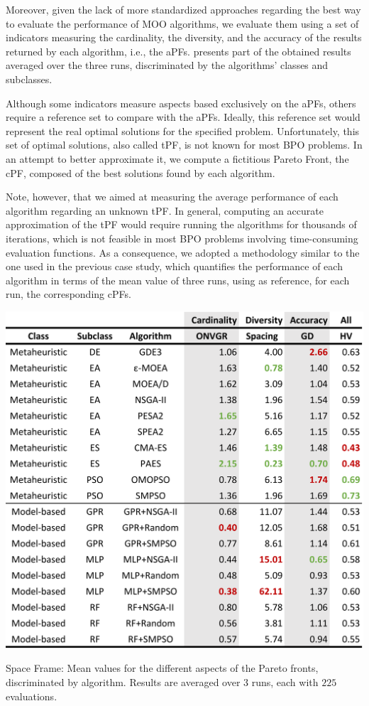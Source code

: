 Moreover, given the lack of more standardized approaches regarding the best way to evaluate the performance of \ac{MOO} algorithms, we evaluate them using a set of indicators measuring the cardinality, the diversity, and the accuracy of the results returned by each algorithm, i.e., the \acp{aPF}.  presents part of the obtained results averaged over the three runs, discriminated by the algorithms' classes and subclasses.

Although some indicators measure aspects based exclusively on the \acp{aPF}, others require a reference set to compare with the \acp{aPF}. Ideally, this reference set would represent the real optimal solutions for the specified problem. Unfortunately, this set of optimal solutions, also called \ac{tPF}, is not known for most \ac{BPO} problems. In an attempt to better approximate it, we compute a fictitious Pareto Front, the \ac{cPF}, composed of the best solutions found by each algorithm. 

Note, however, that we aimed at measuring the average performance of each algorithm regarding an unknown \ac{tPF}. In general, computing an accurate approximation of the \ac{tPF} would require running the algorithms for thousands of iterations, which is not feasible in most \ac{BPO} problems involving time-consuming evaluation functions. As a consequence, we adopted a methodology similar to the one used in the previous case study, which quantifies the performance of each algorithm in terms of the mean value of three runs, using as reference, for each run, the corresponding \acp{cPF}. 

\begin{table}[]
	\centering
	\label{table:spaceframe}
	\includegraphics[width=\columnwidth]{Images/spaceframe/indicators_by_alg_mean_20190509.png}
	\caption{Space Frame: Mean values for the different aspects of the Pareto fronts, discriminated by algorithm. Results are averaged over $3$ runs, each with $225$ evaluations.}
\end{table}

